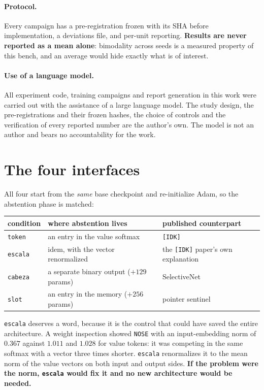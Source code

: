 \documentclass[11pt,a4paper]{article}
\begin{document}
\paragraph{Protocol.} Every campaign has a pre-registration frozen with its SHA before
implementation, a deviations file, and per-unit reporting. \textbf{Results are never reported as a
mean alone}: bimodality across seeds is a measured property of this bench, and an average would hide
exactly what is of interest.

\paragraph{Use of a language model.} All experiment code, training campaigns and report generation
in this work were carried out with the assistance of a large language model. The study design, the
pre-registrations and their frozen hashes, the choice of controls and the verification of every
reported number are the author's own. The model is not an author and bears no accountability for the
work.

\section{The four interfaces}

All four start from the \emph{same} base checkpoint and re-initialize Adam, so the abstention phase
is matched:

\begin{center}
\small\begin{tabular}{lll}
\toprule
condition & where abstention lives & published counterpart \\
\midrule
\texttt{token} & an entry in the value softmax & \texttt{[IDK]} \citep{cohen2024idk} \\
\texttt{escala} & idem, with the vector renormalized & the \texttt{[IDK]} paper's own explanation \\
\texttt{cabeza} & a separate binary output ($+129$ params) & SelectiveNet \citep{geifman2019selectivenet} \\
\texttt{slot} & an entry in the memory ($+256$ params) & pointer sentinel \citep{merity2016pointer} \\
\bottomrule
\end{tabular}
\end{center}

\texttt{escala} deserves a word, because it is the control that could have saved the entire
architecture. A weight inspection showed \texttt{NOSE} with an input-embedding norm of $0.367$
against $1.011$ and $1.028$ for value tokens: it was competing in the same softmax with a vector
three times shorter. \texttt{escala} renormalizes it to the mean norm of the value vectors on both
input and output sides. \textbf{If the problem were the norm, \texttt{escala} would fix it and no
new architecture would be needed.}
\end{document}

